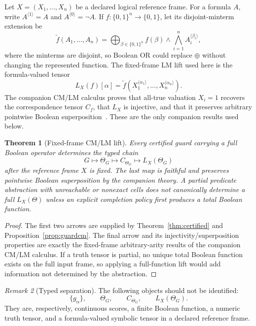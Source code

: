 \documentclass[11pt]{article}
\newtheorem{theorem}{Theorem}[section]
\theoremstyle{definition}
\theoremstyle{remark}
\newtheorem{remark}[theorem]{Remark}
\newcommand{\B}{\{0,1\}}
\begin{document}
Let $X=(X_1,\ldots,X_n)$ be a declared logical reference frame. For a formula $A$, write $A^{\langle1\rangle}=A$ and $A^{\langle0\rangle}=\neg A$. If $f:\B^n\to\B$, let its disjoint-minterm extension be
\[
 \widetilde f(A_1,\ldots,A_n)
 =\bigoplus_{\beta\in\B^n}
   f(\beta)\wedge\bigwedge_{i=1}^n A_i^{\langle\beta_i\rangle},
\]
where the minterms are disjoint, so Boolean OR could replace $\oplus$ without changing the represented function. The fixed-frame LM lift used here is the formula-valued tensor
\begin{equation}\label{eq:LMdef}
 L_X(f)[\alpha]
 =\widetilde f\!\left(
 X_1^{\langle\alpha_1\rangle},\ldots,
 X_n^{\langle\alpha_n\rangle}
 \right).
\end{equation}
The companion CM/LM calculus proves that all-true valuation $X_i=1$ recovers the correspondence tensor $C_f$, that $L_X$ is injective, and that it preserves arbitrary pointwise Boolean superposition~\cite{TheoryCMLM2026}. These are the only companion results used below.

\begin{theorem}[Fixed-frame CM/LM lift]\label{thm:lmlift}
Every certified guard carrying a full Boolean operator determines the typed chain
\[
 \boxed{
 G
 \longmapsto
 \Theta_G
 \longmapsto
 C_{\Theta_G}
 \longmapsto
 L_X(\Theta_G)
 }
\]
after the reference frame $X$ is fixed. The last map is faithful and preserves pointwise Boolean superposition by the companion theory. A partial predicate abstraction with unreachable or nonexact cells does not canonically determine a full $L_X(\Theta)$ unless an explicit completion policy first produces a total Boolean function.
\end{theorem}

\begin{proof}
The first two arrows are supplied by Theorem~\ref{thm:certified} and Proposition~\ref{prop:guardcm}. The final arrow and its injectivity/superposition properties are exactly the fixed-frame arbitrary-arity results of the companion CM/LM calculus. If a truth tensor is partial, no unique total Boolean function exists on the full input frame, so applying a full-function lift would add information not determined by the abstraction.
\end{proof}

\begin{remark}[Typed separation]
The following objects should not be identified:
\[
 \{g_\alpha\},
 \qquad
 \Theta_G,
 \qquad
 C_{\Theta_G},
 \qquad
 L_X(\Theta_G).
\]
They are, respectively, continuous scores, a finite Boolean function, a numeric truth tensor, and a formula-valued symbolic tensor in a declared reference frame.
\end{remark}
\end{document}
